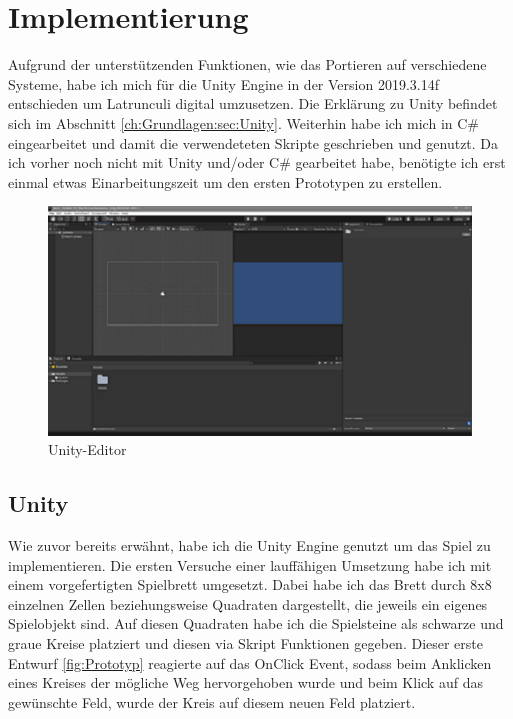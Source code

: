
\chapter{Implementierung}
\label{ch:Implementierung}

Aufgrund der unterstützenden Funktionen, wie das Portieren auf verschiedene Systeme, habe ich mich für die Unity Engine in der Version 2019.3.14f entschieden um Latrunculi digital umzusetzen. Die Erklärung zu Unity befindet sich im Abschnitt \ref{ch:Grundlagen:sec:Unity}. Weiterhin habe ich mich in C\# eingearbeitet und damit die verwendeteten Skripte geschrieben und genutzt. Da ich vorher noch nicht mit Unity und/oder C\# gearbeitet habe, benötigte ich erst einmal etwas Einarbeitungszeit um den ersten Prototypen zu erstellen.

\begin{figure}[h]
	\centering
	\includegraphics{img/Unity-Editor}
	\caption{Unity-Editor}
	\label{fig:Editor}
\end{figure}

\section{Unity}
\label{ch:Implementierung:sec:Unity}

Wie zuvor bereits erwähnt, habe ich die Unity Engine genutzt um das Spiel zu implementieren. Die ersten Versuche einer lauffähigen Umsetzung habe ich mit einem vorgefertigten Spielbrett umgesetzt. Dabei habe ich das Brett durch 8x8 einzelnen Zellen beziehungsweise Quadraten dargestellt, die jeweils ein eigenes Spielobjekt sind. Auf diesen Quadraten habe ich die Spielsteine als schwarze und graue Kreise platziert und diesen via Skript Funktionen gegeben. Dieser erste Entwurf \ref{fig:Prototyp} reagierte auf das OnClick Event, sodass beim Anklicken eines Kreises der mögliche Weg hervorgehoben wurde und beim Klick auf das gewünschte Feld, wurde der Kreis auf diesem neuen Feld platziert.

